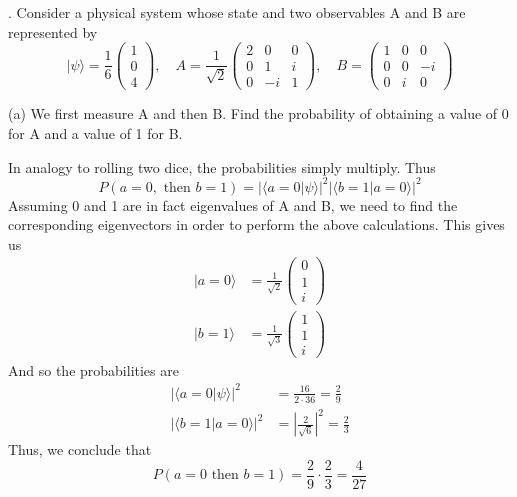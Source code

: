 \documentclass[a4paper, 11pt]{article}
\newcommand{\ket}[1]{|#1\rangle}
\newcommand{\braket}[2]{\langle #1 | #2 \rangle}
\newenvironment{solution}{%
	\begin{list}{}{%
			\setlength{\topsep}{0pt}%
			\setlength{\leftmargin}{1.5cm}%
			\setlength{\rightmargin}{1.5cm}%
			\setlength{\listparindent}{\parindent}%
			\setlength{\itemindent}{\parindent}%
			\setlength{\parsep}{\parskip}%
		}%
		\item[]}{\end{list}}
\begin{document}
. Consider a physical system whose state and two observables A and B are represented by
	\begin{equation*}
		\ket{\psi} = \frac{1}{6}\begin{pmatrix}1\\0\\4\end{pmatrix}, \quad A=\frac{1}{\sqrt{2}}\begin{pmatrix}
		2 & 0 & 0 \\ 
		0 & 1 & i \\ 
		0 & -i & 1
		\end{pmatrix}, \quad B = \begin{pmatrix}
		1 & 0 & 0 \\ 
		0 & 0 & -i \\ 
		0 & i & 0
		\end{pmatrix}
	\end{equation*} 

\noindent (a) We first measure A and then B. Find the probability of obtaining a value of 0 for A and a value of 1 for B. 
	\begin{solution}
		In analogy to rolling two dice, the probabilities simply multiply. Thus 
			\begin{equation*}
				P(a=0, \text{ then } b=1) = \left|\braket{a=0}{\psi}\right|^2\left|\braket{b=1}{a=0}\right|^2
			\end{equation*}
		Assuming 0 and 1 are in fact eigenvalues of A and B, we need to find the corresponding eigenvectors in order to perform the above calculations. This gives us
			\begin{align*}
				\ket{a=0} &= \frac{1}{\sqrt{2}}\begin{pmatrix} 0 \\ 1 \\ i\end{pmatrix} \\ 
				\ket{b=1} &= \frac{1}{\sqrt{3}}\begin{pmatrix} 1 \\ 1 \\ i\end{pmatrix}
			\end{align*}
		And so the probabilities are
			\begin{align*}
				\left|\braket{a=0}{\psi}\right|^2 &= \frac{16}{2\cdot 36} = \frac{2}{9} \\ 
				\left| \braket{b=1}{a=0} \right|^2 &= \left|\frac{2}{\sqrt{6}}\right|^2 = \frac{2}{3}
			\end{align*}
		Thus, we conclude that
			\begin{equation*}
				P\left( a=0 \text{ then } b=1 \right) = \frac{2}{9}\cdot \frac{2}{3} = \frac{4}{27}
			\end{equation*}
	\end{solution}
\end{document}
